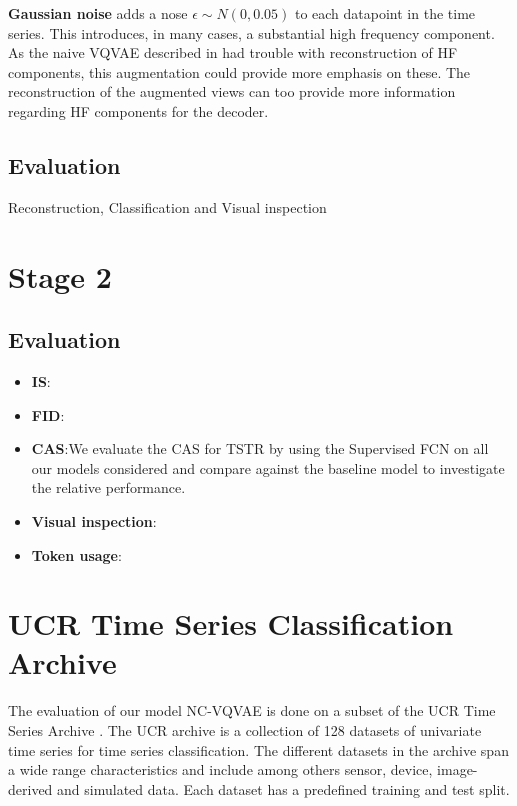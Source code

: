 \documentclass[../../thesis.tex]{subfiles}
\begin{document}
\textbf{Gaussian noise} adds a nose $\epsilon \sim N(0,0.05)$ to each datapoint in the time series. This introduces, in many cases, a substantial high frequency component. As the naive VQVAE described in \cite{TimeVQVAE} had trouble with reconstruction of HF components, this augmentation could provide more emphasis on these. The reconstruction of the augmented views can too provide more information regarding HF components for the decoder.

\subsection{Evaluation}
Reconstruction, Classification and Visual inspection



\section{Stage 2}


\subsection{Evaluation}

\begin{itemize}
    \item \textbf{IS}:
    \item \textbf{FID}:
    \item \textbf{CAS}:We evaluate the CAS for TSTR by using the Supervised FCN on all our models considered and compare against the baseline model to investigate the relative performance. 
    \item \textbf{Visual inspection}:
    \item \textbf{Token usage}:
\end{itemize}


\section{UCR Time Series Classification Archive}
The evaluation of our model NC-VQVAE is done on a subset of the UCR Time Series Archive \cite{UCRArchive2018}. The UCR archive is a collection of 128 datasets of univariate time series for time series classification. The different datasets in the archive span a wide range characteristics and include among others sensor, device, image-derived and simulated data. Each dataset has a predefined training and test split.\newline
\end{document}
